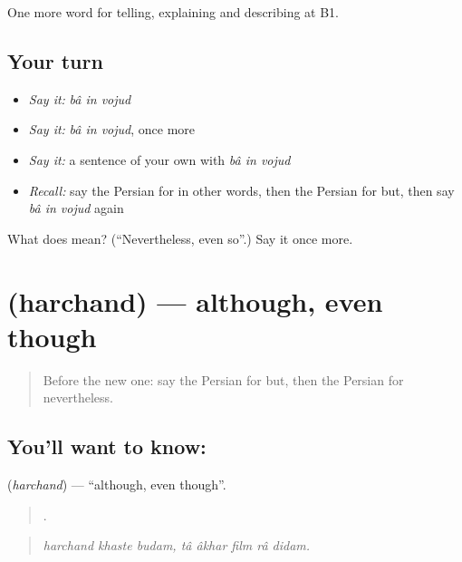 \begin{grammarlens}[title={What you've built}]
One more word for telling, explaining and describing at B1.
\end{grammarlens}

\subsection*{Your turn}
\begin{itemize}
\raggedright
  \item \emph{Say it:} \emph{bâ in vojud}
  \item \emph{Say it:} \emph{bâ in vojud}, once more
  \item \emph{Say it:} a sentence of your own with \emph{bâ in vojud}
  \item \emph{Recall:} say the Persian for in other words, then the Persian for but, then say \emph{bâ in vojud} again
\end{itemize}

\begin{tcolorbox}[breakable,colback=teal!4,colframe=teal!35!black,title={Before you move on}]
What does    mean? (\textquotedblleft{}Nevertheless, even so\textquotedblright{}.) Say it once more.
\end{tcolorbox}
\section[\texorpdfstring{\fa{هرچند} (harchand)}{هرچند (harchand)}]{ (harchand) — although, even though}

\label{lesson:FA-C367-harchand}



\begin{quote}
Before the new one: say the Persian for but, then the Persian for nevertheless.
\end{quote}

\subsection*{You'll want to know: }
\textbf{} (\emph{harchand}) — \textquotedblleft{}although, even though\textquotedblright{}.

\begin{quote}
       .
\end{quote}

\begin{quote}
\emph{harchand khaste budam, tâ âkhar film râ didam.}
\end{quote}

